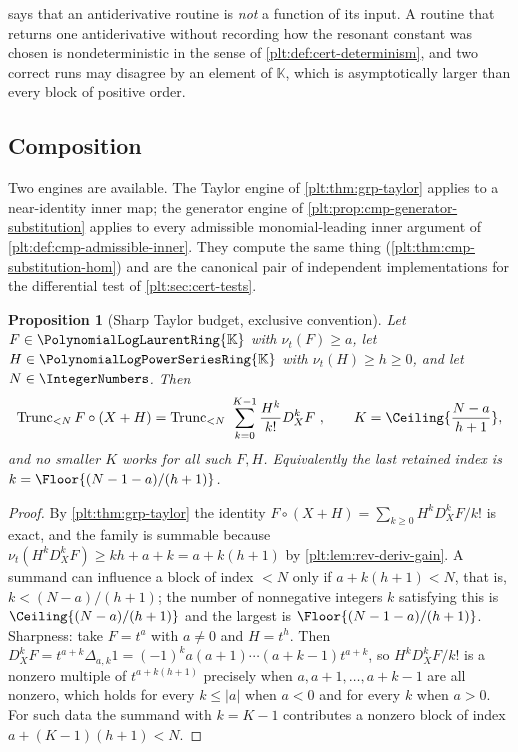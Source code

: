 \documentclass[11pt,oneside]{article}
\theoremstyle{plain}
\newtheorem{proposition}[theorem]{Proposition}
\theoremstyle{definition}
\theoremstyle{remark}
\newcommand{\K}{\mathbb{K}}
\newcommand{\PLpow}{\PolynomialLogPowerSeriesRing{\K}}   %
\newcommand{\PLlau}{\PolynomialLogLaurentRing{\K}}       %
\newcommand{\ordt}{\nu_{t}}                              %
\newcommand{\Trunc}[2]{\operatorname{Trunc}_{<#2}#1}     %
\newcommand{\DX}{D_{X}}                                  %
\newcommand{\shiftop}[2]{\Delta_{#1,#2}}                 %
\newcommand{\compose}{\mathbin{\circ}}
\begin{document}
\begin{warningbox}
 says that an antiderivative routine is
\emph{not} a function of its input.  A routine that returns one antiderivative
without recording how the resonant constant was chosen is nondeterministic in
the sense of \cref{plt:def:cert-determinism}, and two correct runs may disagree
by an element of \(\K\), which is asymptotically larger than every block of
positive order.
\end{warningbox}

\subsection{Composition}
\label{plt:sec:alg-composition}

Two engines are available.  The Taylor engine of \cref{plt:thm:grp-taylor}
applies to a near-identity inner map; the generator engine of
\cref{plt:prop:cmp-generator-substitution} applies to every admissible
monomial-leading inner argument of \cref{plt:def:cmp-admissible-inner}.  They
compute the same thing (\cref{plt:thm:cmp-substitution-hom}) and are the
canonical pair of independent implementations for the differential test of
\cref{plt:sec:cert-tests}.

\begin{proposition}[Sharp Taylor budget, exclusive convention]
\label{plt:prop:alg-taylor-budget}
Let \(F\in\PLlau\) with \(\ordt(F)\ge a\), let \(H\in\PLpow\) with
\(\ordt(H)\ge h\ge0\), and let \(N\in\IntegerNumbers\).  Then
\[
 \Trunc{F\compose(X+H)}{N}
 =\Trunc{\ \sum_{k=0}^{K-1}\frac{H^k}{k!}\DX^kF\ }{N},
 \qquad
 K=\Ceiling{\frac{N-a}{h+1}},
\]
and no smaller \(K\) works for all such \(F,H\).  Equivalently the last
retained index is \(k=\Floor{(N-1-a)/(h+1)}\).
\end{proposition}

\begin{proof}
By \cref{plt:thm:grp-taylor} the identity
\(F\compose(X+H)=\sum_{k\ge0}H^k\DX^kF/k!\) is exact, and the family is
summable because \(\ordt(H^k\DX^kF)\ge kh+a+k=a+k(h+1)\) by
\cref{plt:lem:rev-deriv-gain}.  A summand can influence a block of index
\(<N\) only if \(a+k(h+1)<N\), that is, \(k<(N-a)/(h+1)\); the number of
nonnegative integers \(k\) satisfying this is \(\Ceiling{(N-a)/(h+1)}\) and the
largest is \(\Floor{(N-1-a)/(h+1)}\).  Sharpness: take \(F=t^{a}\) with
\(a\ne0\) and \(H=t^{h}\).  Then \(\DX^kF=t^{a+k}\shiftop{a}{k}1
=(-1)^k a(a+1)\cdots(a+k-1)t^{a+k}\), so
\(H^k\DX^kF/k!\) is a nonzero multiple of \(t^{a+k(h+1)}\) precisely when
\(a,a+1,\dots,a+k-1\) are all nonzero, which holds for every \(k\le|a|\) when
\(a<0\) and for every \(k\) when \(a>0\).  For such data the summand with
\(k=K-1\) contributes a nonzero block of index \(a+(K-1)(h+1)<N\).
\end{proof}
\end{document}
